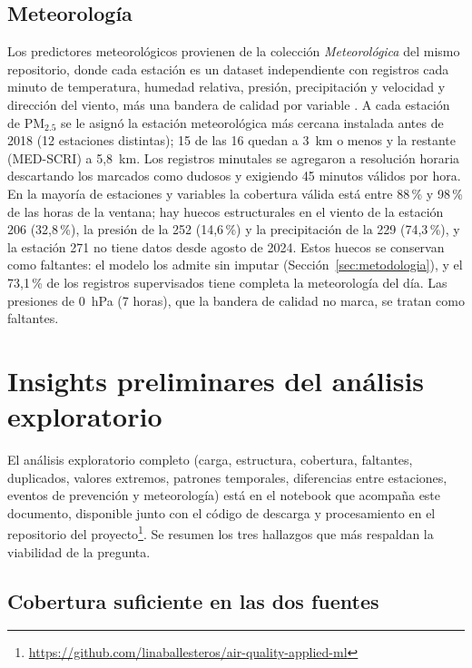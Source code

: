 \documentclass[conference]{IEEEtran}
\begin{document}
\subsection{Meteorología}

Los predictores meteorológicos provienen de la colección
\textit{Meteorológica} del mismo repositorio, donde cada estación es un
dataset independiente con registros cada minuto de temperatura, humedad
relativa, presión, precipitación y velocidad y dirección del viento, más una
bandera de calidad por variable \cite{siata2026meteo}. A cada estación de
PM$_{2.5}$ se le asignó la estación meteorológica más cercana instalada
antes de 2018 (12 estaciones distintas); 15 de las 16 quedan a 3~km o menos
y la restante (MED-SCRI) a 5,8~km. Los registros minutales se agregaron a
resolución horaria descartando los marcados como dudosos y exigiendo 45
minutos válidos por hora. En la mayoría de estaciones y variables la
cobertura válida está entre 88\,\% y 98\,\% de las horas de la ventana; hay
huecos estructurales en el viento de la estación 206 (32,8\,\%), la presión
de la 252 (14,6\,\%) y la precipitación de la 229 (74,3\,\%), y la estación
271 no tiene datos desde agosto de 2024. Estos huecos se conservan como
faltantes: el modelo los admite sin imputar (Sección~\ref{sec:metodologia}),
y el 73,1\,\% de los registros supervisados tiene completa la meteorología
del día. Las presiones de 0~hPa (7 horas), que la bandera de calidad no
marca, se tratan como faltantes.


\section{Insights preliminares del análisis exploratorio}
\label{sec:eda}

El análisis exploratorio completo (carga, estructura, cobertura, faltantes,
duplicados, valores extremos, patrones temporales, diferencias entre
estaciones, eventos de prevención y meteorología) está en el notebook que
acompaña este documento, disponible junto con el código de descarga y
procesamiento en el repositorio del
proyecto\footnote{\url{https://github.com/linaballesteros/air-quality-applied-ml}}.
Se resumen los tres hallazgos que más respaldan la
viabilidad de la pregunta.

\subsection{Cobertura suficiente en las dos fuentes}
\end{document}
